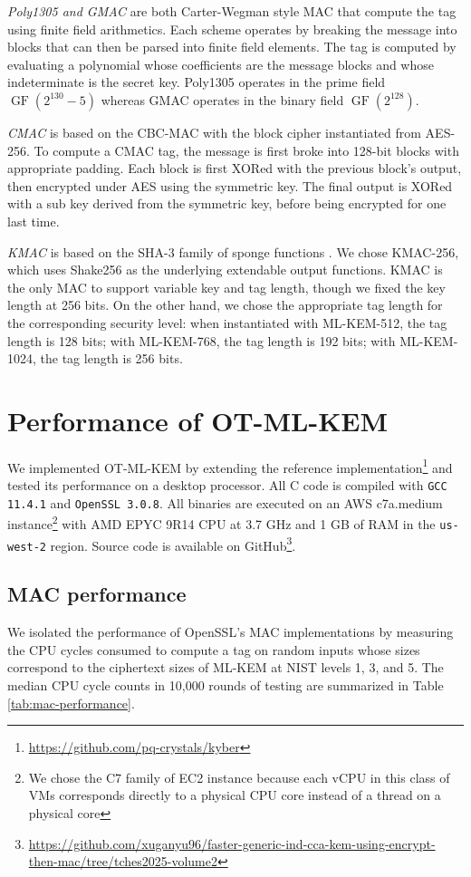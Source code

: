 \documentclass[letterpaper,12pt,titlepage,oneside,final]{book}
\begin{document}
\emph{Poly1305 and GMAC} are both Carter-Wegman style MAC \cite{wegman1981new} that compute the tag using finite field arithmetics.
Each scheme operates by breaking the message into blocks that can then be parsed into finite field elements.
The tag is computed by evaluating a polynomial whose coefficients are the message blocks and whose indeterminate is the secret key.
Poly1305 operates in the prime field $\operatorname{GF}(2^{130} - 5)$ whereas GMAC operates in the binary field $\operatorname{GF}(2^{128})$.

\emph{CMAC} is based on the CBC-MAC with the block cipher instantiated from AES-256. To compute a CMAC tag, the message is first broke into 128-bit blocks with appropriate padding. Each block is first XORed with the previous block's output, then encrypted under AES using the symmetric key. The final output is XORed with a sub key derived from the symmetric key, before being encrypted for one last time.

\emph{KMAC} is based on the SHA-3 family of sponge functions \cite{FIPS202}. We chose KMAC-256, which uses Shake256 as the underlying extendable output functions. KMAC is the only MAC to support variable key and tag length, though we fixed the key length at 256 bits. On the other hand, we chose the appropriate tag length for the corresponding security level: when instantiated with ML-KEM-512, the tag length is 128 bits; with ML-KEM-768, the tag length is 192 bits; with ML-KEM-1024, the tag length is 256 bits.

\section{Performance of OT-ML-KEM}\label{sec:performance-evaluation-of-otmlkem}
We implemented OT-ML-KEM by extending the reference implementation\footnote{\scriptsize \url{https://github.com/pq-crystals/kyber}} and tested its performance on a desktop processor.
All C code is compiled with \texttt{GCC 11.4.1} and \texttt{OpenSSL 3.0.8}.
All binaries are executed on an AWS c7a.medium instance\footnote{\scriptsize We chose the C7 family of EC2 instance because each vCPU in this class of VMs corresponds directly to a physical CPU core instead of a thread on a physical core} with AMD EPYC 9R14 CPU at 3.7 GHz and 1 GB of RAM in the \texttt{us-west-2} region.
Source code is available on GitHub\footnote{\scriptsize \scriptsize\url{https://github.com/xuganyu96/faster-generic-ind-cca-kem-using-encrypt-then-mac/tree/tches2025-volume2}}.

\subsection{MAC performance}
We isolated the performance of OpenSSL's MAC implementations by measuring the CPU cycles consumed to compute a tag on random inputs whose sizes correspond to the ciphertext sizes of ML-KEM at NIST levels 1, 3, and 5.
The median CPU cycle counts in 10,000 rounds of testing are summarized in Table \ref{tab:mac-performance}.
\end{document}
